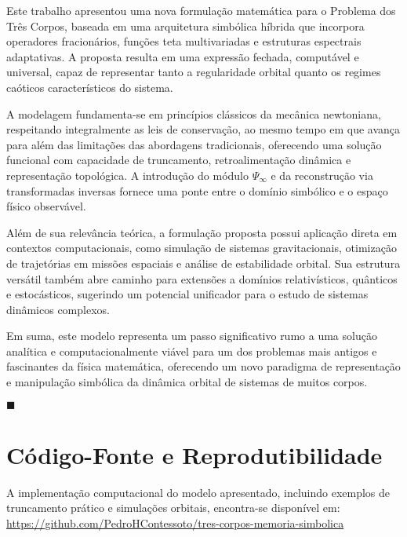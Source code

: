 \documentclass[12pt]{article}
\begin{document}
Este trabalho apresentou uma nova formulação matemática para o Problema dos Três Corpos, baseada em uma arquitetura simbólica híbrida que incorpora operadores fracionários, funções teta multivariadas e estruturas espectrais adaptativas. A proposta resulta em uma expressão fechada, computável e universal, capaz de representar tanto a regularidade orbital quanto os regimes caóticos característicos do sistema.

A modelagem fundamenta-se em princípios clássicos da mecânica newtoniana, respeitando integralmente as leis de conservação, ao mesmo tempo em que avança para além das limitações das abordagens tradicionais, oferecendo uma solução funcional com capacidade de truncamento, retroalimentação dinâmica e representação topológica. A introdução do módulo \(\Psi_\infty\) e da reconstrução via transformadas inversas fornece uma ponte entre o domínio simbólico e o espaço físico observável.

Além de sua relevância teórica, a formulação proposta possui aplicação direta em contextos computacionais, como simulação de sistemas gravitacionais, otimização de trajetórias em missões espaciais e análise de estabilidade orbital. Sua estrutura versátil também abre caminho para extensões a domínios relativísticos, quânticos e estocásticos, sugerindo um potencial unificador para o estudo de sistemas dinâmicos complexos.

Em suma, este modelo representa um passo significativo rumo a uma solução analítica e computacionalmente viável para um dos problemas mais antigos e fascinantes da física matemática, oferecendo um novo paradigma de representação e manipulação simbólica da dinâmica orbital de sistemas de muitos corpos.

\begin{flushright}
\(\blacksquare\)
\end{flushright}

\section*{Código-Fonte e Reprodutibilidade}

A implementação computacional do modelo apresentado, incluindo exemplos de truncamento prático e simulações orbitais, encontra-se disponível em:\\
\url{https://github.com/PedroHContessoto/tres-corpos-memoria-simbolica}
\end{document}

